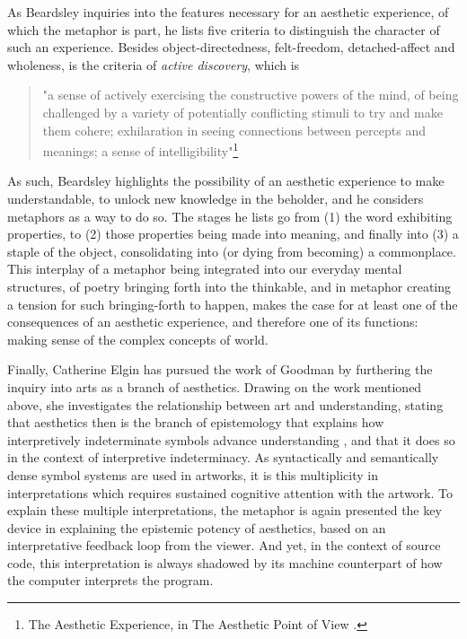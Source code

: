 As Beardsley inquiries into the features necessary for an aesthetic experience, of which the metaphor is part, he lists five criteria to distinguish the character of such an experience. Besides object-directedness, felt-freedom, detached-affect and wholeness, is the criteria of \emph{active discovery}, which is

\begin{quote}
    "a sense of actively exercising the constructive powers of the mind, of being challenged by a variety of potentially conflicting stimuli to try and make them cohere; exhilaration in seeing connections between percepts and meanings; a sense of intelligibility"\footnote{The Aesthetic Experience, in The Aesthetic Point of View \citep{beardsley_aesthetic_1970}.}
\end{quote}

As such, Beardsley highlights the possibility of an aesthetic experience to make understandable, to unlock new knowledge in the beholder, and he considers metaphors as a way to do so. The stages he lists go from (1) the word exhibiting properties, to (2) those properties being made into meaning, and finally into (3) a staple of the object, consolidating into (or dying from becoming) a commonplace. This interplay of a metaphor being integrated into our everyday mental structures, of poetry bringing forth into the thinkable, and in metaphor creating a tension for such bringing-forth to happen, makes the case for at least one of the consequences of an aesthetic experience, and therefore one of its functions: making sense of the complex concepts of world.

Finally, Catherine Elgin has pursued the work of Goodman by furthering the inquiry into arts as a branch of aesthetics. Drawing on the work mentioned above, she investigates the relationship between art and understanding, stating that aesthetics then is the branch of epistemology that explains how interpretively indeterminate symbols advance understanding \citep{elgin_understanding_2020}, and that it does so in the context of interpretive indeterminacy. As syntactically and semantically dense symbol systems are used in artworks,  it is this multiplicity in interpretations which requires sustained cognitive attention with the artwork. To explain these multiple interpretations, the metaphor is again presented the key device in explaining the epistemic potency of aesthetics, based on an interpretative feedback loop from the viewer. And yet, in the context of source code, this interpretation is always shadowed by its machine counterpart of how the computer interprets the program.

